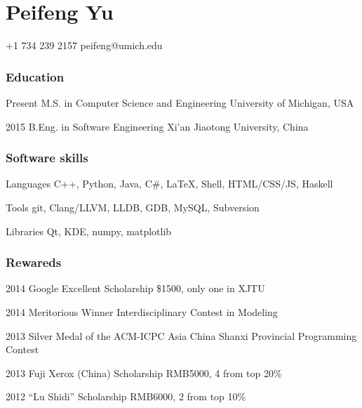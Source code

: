 \documentclass{tccv}
\begin{document}
\part{Peifeng Yu}

    {+1 734 239 2157}
    {peifeng@umich.edu}

\section{Education}

\begin{yearlist}

\item{Present}
     {M.S. in Computer Science and \newline Engineering}
     {University of Michigan, USA}

\item{2015}
     {B.Eng. in Software Engineering}
     {Xi'an Jiaotong University, China}

\end{yearlist}


\section{Software skills}

\begin{factlist}

\item{Languages}
     {C++, Python, Java, C\#, \LaTeX, Shell, HTML/CSS/JS, Haskell}

\item{Tools}
     {git, Clang/LLVM, LLDB, GDB, MySQL, Subversion}

\item{Libraries}
     {Qt, KDE, numpy, matplotlib}
\end{factlist}

\section{Rewareds}

\begin{yearlist}
    \item{2014}
         {Google Excellent Scholarship}
         {\$1500, only one in XJTU}
    \item{2014}
         {Meritorious Winner}
         {Interdisciplinary Contest in Modeling}
    \item{2013}
         {Silver Medal of the ACM-ICPC}
         {Asia China Shanxi Provincial Programming Contest}
    \item{2013}
         {Fuji Xerox (China) Scholarship}
         {RMB5000, 4 from top 20\%}
    \item{2012}
         {``Lu Shidi'' Scholarship}
         {RMB6000, 2 from top 10\%}
\end{yearlist}
\end{document}
